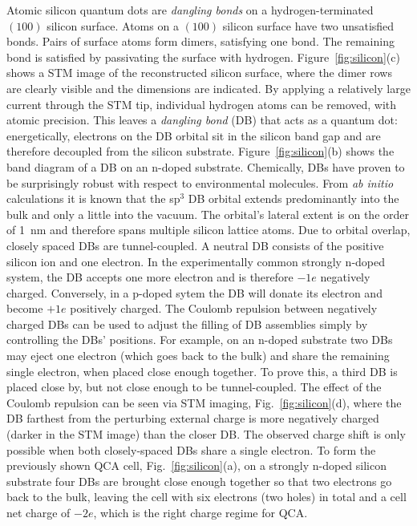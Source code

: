 Atomic silicon quantum dots are \emph{dangling bonds} on a hydrogen-terminated
$(100)$ silicon surface. Atoms on a $(100)$ silicon surface have two unsatisfied
bonds. Pairs of surface atoms form dimers, satisfying one bond. The remaining
bond is satisfied by passivating the surface with hydrogen.
Figure~\ref{fig:silicon}(c) shows a STM image of the reconstructed silicon
surface, where the dimer rows are clearly visible and the dimensions are
indicated. By applying a relatively large current through the STM tip,
individual hydrogen atoms can be removed, with atomic precision. This leaves a
\emph{dangling bond} (DB) that acts as a quantum dot: energetically, electrons
on the DB orbital sit in the silicon band gap and are therefore decoupled from
the silicon substrate. Figure~\ref{fig:silicon}(b) shows the band diagram of a
DB on an n-doped substrate. Chemically, DBs have proven to be surprisingly
robust with respect to environmental molecules. From \emph{ab initio}
calculations it is known that the sp$^3$ DB orbital extends predominantly into
the bulk and only a little into the vacuum. The orbital's lateral extent is on
the order of 1~nm and therefore spans multiple silicon lattice atoms. Due to
orbital overlap, closely spaced DBs are tunnel-coupled. A neutral DB consists of
the positive silicon ion and one electron. In the experimentally common strongly
n-doped system, the DB accepts one more electron and is therefore $-1e$
negatively charged. Conversely, in a p-doped sytem the DB will donate its
electron and become $+1e$ positively charged. The Coulomb repulsion between
negatively charged DBs can be used to adjust the filling of DB assemblies simply
by controlling the DBs' positions. For example, on an n-doped substrate two DBs
may eject one electron (which goes back to the bulk) and share the remaining
single electron, when placed close enough together. To prove this, a third DB is
placed close by, but not close enough to be tunnel-coupled. The effect of the
Coulomb repulsion can be seen via STM imaging, Fig.~\ref{fig:silicon}(d),
where the DB farthest from the perturbing external charge is more negatively
charged (darker in the STM image) than the closer DB. The observed charge shift
is only possible when both closely-spaced DBs share a single electron. To form
the previously shown QCA cell, Fig.~\ref{fig:silicon}(a), on a strongly
n-doped silicon substrate four DBs are brought close enough together so that two
electrons go back to the bulk, leaving the cell with six electrons (two holes)
in total and a cell net charge of $-2e$, which is the right charge regime for
QCA.

